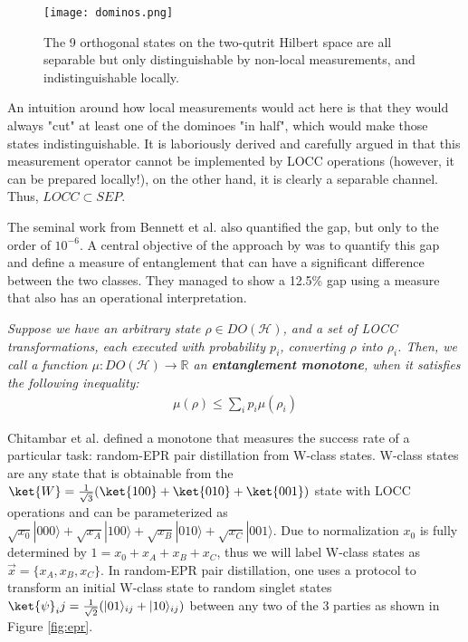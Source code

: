 \begin{figure}[!ht]
\center
\texttt{[image: dominos.png]}
\caption{The 9 orthogonal states on the two-qutrit Hilbert space are all separable but only distinguishable by non-local measurements, and  indistinguishable locally.}
\label{fig:dominos}
\end{figure}

An intuition around how local measurements would act here is that they would always "cut" at least one of the dominoes "in half", which would make those states indistinguishable. It is laboriously derived and carefully argued in  \cite{bennett_quantum_1999} that this measurement operator cannot be implemented by LOCC operations (however, it can be prepared locally!), on the other hand, it is clearly a separable channel. Thus, $LOCC \subset SEP$. 

The seminal work from Bennett et al. also quantified the gap, but only to the order of $10^{-6}$. A central objective of the approach by \cite{chitambar_increasing_2012} was to quantify this gap and define a measure of entanglement that can have a significant difference between the two classes. They managed to show a 12.5\% gap using a measure that also has an operational interpretation. 

\begin{definition} \textit{Suppose we have an arbitrary state $\rho \in DO(\mathcal{H})$, and a set of LOCC transformations, each executed with probability $p_i$, converting $\rho$ into $\rho_i$. Then, we call a function $\mu: DO(\mathcal{H}) \rightarrow \mathbb{R}$ an \textbf{entanglement monotone}, when it satisfies the following inequality: 
\begin{align}
\mu(\rho) \leq \sum_i p_i \mu(\rho_i)
\end{align}
}
\end{definition}

Chitambar et al. defined a monotone that measures the success rate of a particular task: random-EPR pair distillation from  W-class states. W-class states are any state that is obtainable from the $\ket{W}=\frac{1}{\sqrt{3}}(\ket{100}+\ket{010}+\ket{001})$ state with LOCC operations and can be parameterized as $\sqrt{x_0}|000\rangle + \sqrt{x_A}|100\rangle + \sqrt{x_B}|010\rangle + \sqrt{x_C}|001\rangle$. Due to normalization $x_0$ is fully determined by $1=x_0+x_A+x_B+x_C$, thus we will label W-class states as $\vec{x}=\{x_A,x_B,x_C\}$. In random-EPR pair distillation, one uses a protocol to transform an initial W-class state to random singlet states $\ket{\psi}_ij=\frac{1}{\sqrt{2}}(|01\rangle_{ij} + |10\rangle_{ij})$ between any two of the 3 parties as shown in Figure \ref{fig:epr}.

